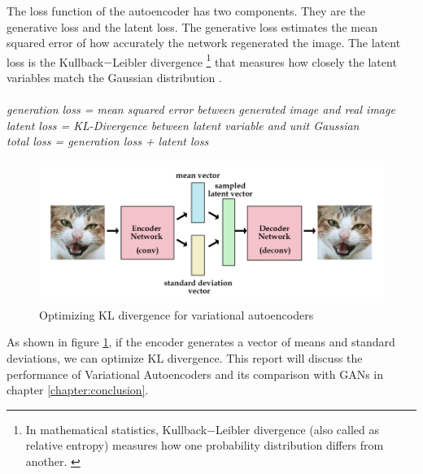 \begin{onehalfspacing}
    The loss function of the autoencoder has two components. They are the 
    generative loss and the latent loss. The generative loss estimates the 
    mean squared error of how accurately the network regenerated the image. 
    The latent loss is the Kullback$-$Leibler divergence 
    \footnote{In mathematical statistics, Kullback$-$Leibler divergence 
    (also called as relative entropy) measures how one probability distribution 
    differs from another. \cite{kldiv_wiki}} that measures how 
    closely the latent variables match the Gaussian distribution 
    \cite{autoencoders_kvfrans}.
    \\
    \\
    \textit{generation loss = mean squared error between generated image 
    and real image}
    \\
    \textit{latent loss = KL-Divergence between latent variable and unit Gaussian}
    \\
    \textit{total loss = generation loss + latent loss}

    \begin{figure}[h]
        \centering
        \includegraphics[width=0.8\linewidth]{images/vae_kl_div.png}
        \caption{Optimizing KL divergence for variational 
        autoencoders \cite{autoencoders_kvfrans}}
        \label{fig:vae}
    \end{figure} 

    As shown in figure \ref{fig:vae}, if the encoder generates a vector of means 
    and standard deviations, we can optimize KL divergence. This report will 
    discuss the performance of Variational Autoencoders and its comparison with 
    GANs in chapter \ref{chapter:conclusion}.

\end{onehalfspacing}